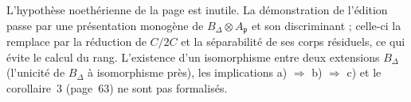 \begin{remarque}
L'hypothèse noethérienne de la page est inutile. La démonstration de l'édition passe par une présentation monogène de $B_\Delta \otimes A_{\mathfrak p}$ et son discriminant ; celle-ci la remplace par la réduction de $C/2C$ et la séparabilité de ses corps résiduels, ce qui évite le calcul du rang. L'existence d'un isomorphisme entre deux extensions $B_\Delta$ (l'unicité de $B_\Delta$ à isomorphisme près), les implications a) $\Rightarrow$ b) $\Rightarrow$ c) et le corollaire~3 (page~63) ne sont pas formalisés.
\end{remarque}
